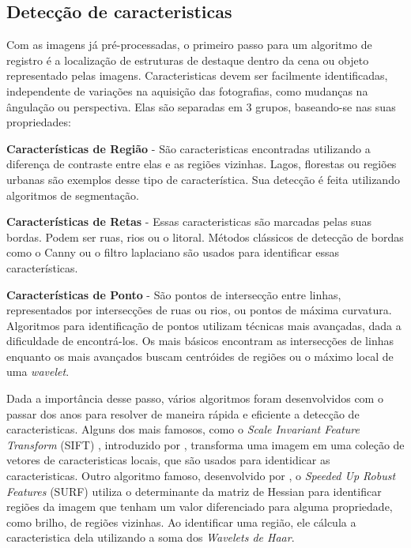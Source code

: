 \subsection{Detecção de caracteristicas}
\label{sec:dec_corr_carac}

    Com as imagens já pré-processadas, o primeiro passo para um algoritmo de registro é a localização de estruturas de 
destaque dentro da cena ou objeto representado pelas imagens. Caracteristicas devem ser facilmente identificadas, 
independente de variações na aquisição das fotografias, como mudanças na ângulação ou perspectiva. 
Elas são separadas em 3 grupos, baseando-se nas suas propriedades:

\textbf{Características de Região} - São caracteristicas encontradas utilizando a diferença de contraste entre elas e
as regiões vizinhas. Lagos, florestas ou regiões urbanas são exemplos desse tipo de característica.
Sua detecção é feita utilizando algoritmos de segmentação.

\textbf{Características de Retas} - Essas caracteristicas são marcadas pelas suas bordas. Podem ser ruas, rios ou o 
litoral. Métodos clássicos de detecção de bordas como o Canny ou o filtro laplaciano são usados para identificar essas 
características.

\textbf{Características de Ponto} - São pontos de intersecção entre linhas, representados por intersecções de ruas ou
rios, ou pontos de máxima curvatura. Algoritmos para identificação de pontos utilizam técnicas mais avançadas, dada a 
dificuldade de encontrá-los. Os mais básicos encontram as intersecções de linhas enquanto os mais avançados buscam
centróides de regiões ou o máximo local de uma \textit{wavelet}.

    Dada a importância desse passo, vários algoritmos foram desenvolvidos com o passar dos anos para resolver de maneira
rápida e eficiente a detecção de caracteristicas. Alguns dos mais famosos, como o 
\textit{Scale Invariant Feature Transform} (SIFT) , introduzido por \cite{lowe1999object}, transforma uma imagem em uma 
coleção de vetores de caracteristicas locais, que são usados para identidicar as caracteristicas. Outro algoritmo famoso,
desenvolvido por \cite{bay2006surf}, o \textit{Speeded Up Robust Features} (SURF) utiliza o determinante da matriz de
Hessian para identificar regiões da imagem que tenham um valor diferenciado para alguma propriedade, como brilho, de 
regiões vizinhas. Ao identificar uma região, ele cálcula a caracteristica dela utilizando a soma dos 
\textit{Wavelets de Haar}.

